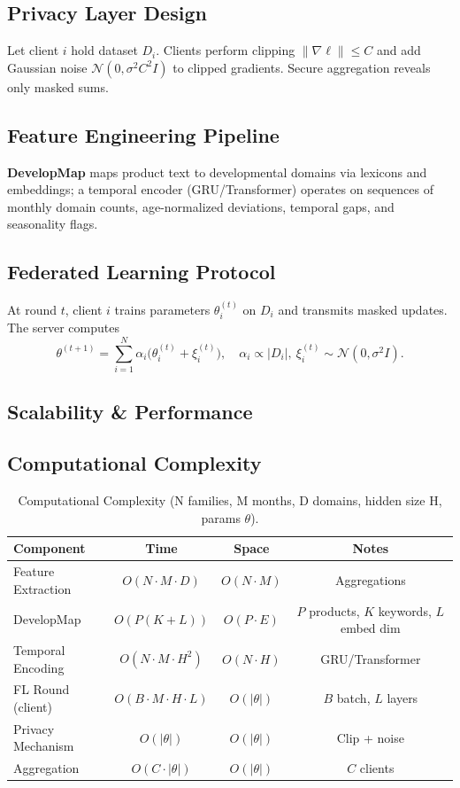 \documentclass[conference]{IEEEtran}
\theoremstyle{plain}
\theoremstyle{remark}
\begin{document}
\subsection{Privacy Layer Design}\label{sec:privacy-layer}
Let client $i$ hold dataset $D_i$. Clients perform clipping $\|\nabla \ell\|\le C$ and add Gaussian noise $\mathcal{N}(0,\sigma^2 C^2 I)$ to clipped gradients. Secure aggregation reveals only masked sums.

\subsection{Feature Engineering Pipeline}
\textbf{DevelopMap} maps product text to developmental domains via lexicons and embeddings; a temporal encoder (GRU/Transformer) operates on sequences of monthly domain counts, age-normalized deviations, temporal gaps, and seasonality flags.

\subsection{Federated Learning Protocol}
At round $t$, client $i$ trains parameters $\theta_i^{(t)}$ on $D_i$ and transmits masked updates. The server computes
\begin{equation}
\theta^{(t{+}1)} = \sum_{i=1}^N \alpha_i \big(\theta_i^{(t)} + \xi_i^{(t)}\big),\quad \alpha_i \propto |D_i|,\ \xi_i^{(t)}\sim\mathcal{N}(0,\sigma^2 I).
\label{eq:fedavgdp}
\end{equation}

\subsection{Scalability \& Performance}
\subsection{Computational Complexity}
\begin{table}[t]
\centering
\caption{Computational Complexity (N families, M months, D domains, hidden size H, params $\theta$).}
\label{tab:complexity}
\begin{tabular}{lccc}
\toprule
Component & Time & Space & Notes\\
\midrule
Feature Extraction & $O(N\!\cdot\!M\!\cdot\!D)$ & $O(N\!\cdot\!M)$ & Aggregations \\
DevelopMap & $O(P(K{+}L))$ & $O(P\!\cdot\!E)$ & $P$ products, $K$ keywords, $L$ embed dim \\
Temporal Encoding & $O(N\!\cdot\!M\!\cdot\!H^2)$ & $O(N\!\cdot\!H)$ & GRU/Transformer \\
FL Round (client) & $O(B\!\cdot\!M\!\cdot\!H\!\cdot\!L)$ & $O(|\theta|)$ & $B$ batch, $L$ layers \\
Privacy Mechanism & $O(|\theta|)$ & $O(|\theta|)$ & Clip + noise \\
Aggregation & $O(C\!\cdot\!|\theta|)$ & $O(|\theta|)$ & $C$ clients \\
\bottomrule
\end{tabular}
\end{table}
\end{document}
